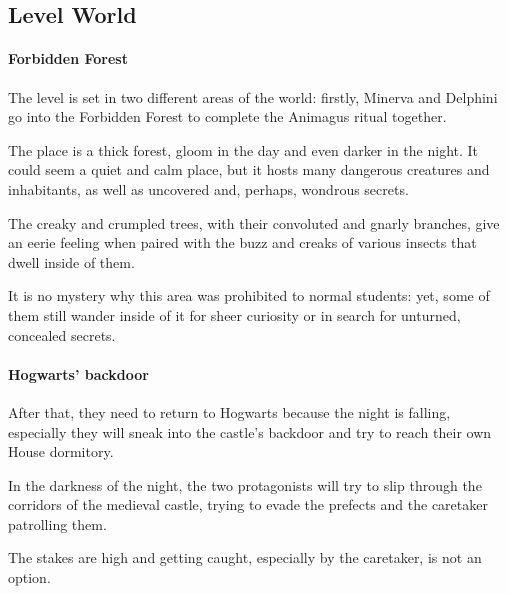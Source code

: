 \pagebreak

\subsection{Level World}

\paragraph{Forbidden Forest}
The level is set in two different areas of the world: firstly, Minerva and Delphini go into the Forbidden Forest to complete the Animagus ritual together. 

The place is a thick forest, gloom in the day and even darker in the night. It could seem a quiet and calm place, but it hosts many dangerous creatures and inhabitants, as well as uncovered and, perhaps, wondrous secrets.


The creaky and crumpled trees, with their convoluted and gnarly branches, give an eerie feeling when paired with the buzz and creaks of various insects that dwell inside of them.

It is no mystery why this area was prohibited to normal students: yet, some of them still wander inside of it for sheer curiosity or in search for unturned, concealed secrets.

\clearpage

\paragraph{Hogwarts' backdoor}

After that, they need to return to Hogwarts because the night is falling, especially they will sneak into the castle's backdoor and try to reach their own House dormitory.


In the darkness of the night, the two protagonists will try to slip through the corridors of the medieval castle, trying to evade the prefects and the caretaker patrolling them.


The stakes are high and getting caught, especially by the caretaker, is not an option. 

\clearpage

